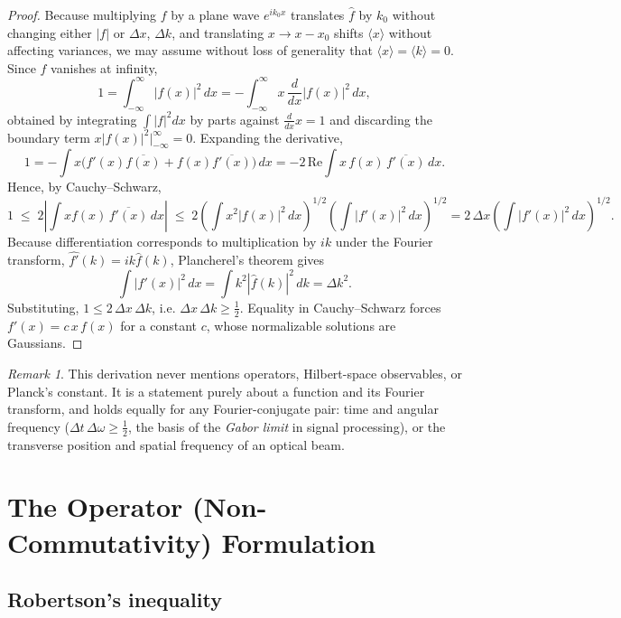\documentclass[11pt]{article}
\theoremstyle{plain}
\theoremstyle{definition}
\theoremstyle{remark}
\newtheorem{remark}[theorem]{Remark}
\begin{document}
\begin{proof}
Because multiplying $f$ by a plane wave $e^{ik_0 x}$ translates $\hat f$ by $k_0$ without changing
either $|f|$ or $\Delta x$, $\Delta k$, and translating $x\to x-x_0$ shifts $\langle x\rangle$
without affecting variances, we may assume without loss of generality that
$\langle x\rangle = \langle k\rangle = 0$. Since $f$ vanishes at infinity,
\[
1 = \int_{-\infty}^{\infty} |f(x)|^2\,dx
= -\int_{-\infty}^{\infty} x\, \frac{d}{dx}|f(x)|^2\,dx ,
\]
obtained by integrating $\int |f|^2 dx$ by parts against $\frac{d}{dx}x = 1$ and discarding the
boundary term $x|f(x)|^2\big|_{-\infty}^{\infty}=0$. Expanding the derivative,
\[
1 = -\int x \big( f'(x)\overline{f(x)} + f(x)\overline{f'(x)} \big)\,dx
= -2\,\mathrm{Re}\!\int x\, f(x)\,\overline{f'(x)}\,dx .
\]
Hence, by Cauchy--Schwarz,
\[
1 \;\leq\; 2\left| \int x f(x)\, \overline{f'(x)}\,dx \right|
\;\leq\; 2 \left(\int x^2 |f(x)|^2\,dx\right)^{1/2}\left(\int |f'(x)|^2\,dx\right)^{1/2}
= 2\,\Delta x \left(\int |f'(x)|^2\,dx\right)^{1/2} .
\]
Because differentiation corresponds to multiplication by $ik$ under the Fourier transform,
$\widehat{f'}(k) = ik\hat f(k)$, Plancherel's theorem gives
\[
\int |f'(x)|^2\,dx = \int k^2 |\hat f(k)|^2\,dk = \Delta k^2 .
\]
Substituting, $1 \leq 2\, \Delta x\, \Delta k$, i.e. $\Delta x\, \Delta k \geq \tfrac12$.
Equality in Cauchy--Schwarz forces $f'(x) = c\, x\, f(x)$ for a constant $c$, whose normalizable
solutions are Gaussians.
\end{proof}

\begin{remark}
This derivation never mentions operators, Hilbert-space observables, or Planck's constant. It is
a statement purely about a function and its Fourier transform, and holds equally for any
Fourier-conjugate pair: time and angular frequency ($\Delta t\,\Delta \omega \geq \tfrac12$,
the basis of the \emph{Gabor limit} in signal processing), or the transverse position and spatial
frequency of an optical beam.
\end{remark}

\section{The Operator (Non-Commutativity) Formulation}

\subsection{Robertson's inequality}
\end{document}
